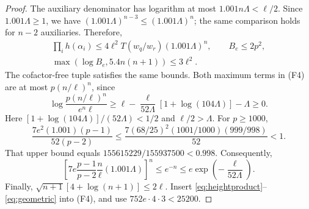 \documentclass{amsart}
\theoremstyle{remark}
\numberwithin{equation}{section}
\begin{document}
\begin{proof}
The auxiliary denominator has logarithm at most $1.001n\Lambda<\ell/2$.
Since $1.001\Lambda\ge1$, we have
$(1.001\Lambda)^{n-3}\le(1.001\Lambda)^n$;
the same comparison holds for $n-2$ auxiliaries.
Therefore,
\begin{gather}
\prod_i h(\alpha_i)\le4\ell^2T(w_q/w_r)(1.001\Lambda)^n,\qquad
B_e\le2p^2,\label{eq:heightproduct}\\
\max(\log B_e,5.4n(n+1))\le3\ell^2.\label{eq:coefficients}
\end{gather}
The cofactor-free tuple satisfies the same bounds.
Both maximum terms in (F4) are at most $p(n/\ell)^n$, since
\[
\log\frac{p(n/\ell)^n}{e^n\ell}
\ge\ell-\frac{\ell}{52\Lambda}[1+\log(104\Lambda)]-\Lambda\ge0.
\]
Here $[1+\log(104\Lambda)]/(52\Lambda)<1/2$ and $\ell/2>\Lambda$.
For $p\ge1000$,
\[
\frac{7e^2(1.001)(p-1)}{52(p-2)}
\le\frac{7(68/25)^2(1001/1000)(999/998)}{52}<1.
\]
That upper bound equals $155615229/155937500<0.998$.
Consequently,
\begin{equation}\label{eq:geometric}
\left[7e\frac{p-1}{p-2}\frac n\ell(1.001\Lambda)\right]^n
 \le e^{-n}\le e\exp\!\left(-\frac{\ell}{52\Lambda}\right).
\end{equation}
Finally, $\sqrt{n+1}[4+\log(n+1)]\le2\ell$.
Insert \eqref{eq:heightproduct}--\eqref{eq:geometric} into (F4), and use
$752e\cdot4\cdot3<25200$.
\end{proof}
\end{document}
